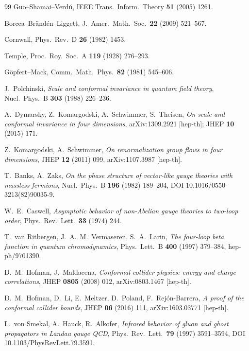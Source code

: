 {\begin{thebibliography}{99}
 Guo--Shamai--Verd\'u, IEEE Trans.\ Inform.\ Theory \textbf{51} (2005) 1261.

 Borcea--Br\"and\'en--Liggett, J.\ Amer.\ Math.\ Soc.\ \textbf{22} (2009)
  521--567.

 Cornwall, Phys.\ Rev.\ D \textbf{26} (1982) 1453.

 Temple, Proc.\ Roy.\ Soc.\ A \textbf{119} (1928) 276--293.

 G\"opfert--Mack, Comm.\ Math.\ Phys.\ \textbf{82} (1981) 545--606.

 J.~Polchinski, \emph{Scale and conformal invariance in quantum field
  theory}, Nucl.\ Phys.\ B \textbf{303} (1988) 226--236.

 A.~Dymarsky, Z.~Komargodski, A.~Schwimmer, S.~Theisen, \emph{On scale and
  conformal invariance in four dimensions}, arXiv:1309.2921 [hep-th]; JHEP \textbf{10} (2015)
  171.

 Z.~Komargodski, A.~Schwimmer, \emph{On renormalization group
  flows in four dimensions}, JHEP \textbf{12} (2011) 099, arXiv:1107.3987 [hep-th].

 T.~Banks, A.~Zaks, \emph{On the phase structure of vector-like gauge
  theories with massless fermions}, Nucl.\ Phys.\ B \textbf{196} (1982) 189--204,
  DOI 10.1016/0550-3213(82)90035-9.

 W.~E.~Caswell, \emph{Asymptotic behavior of non-Abelian gauge theories to
  two-loop order}, Phys.\ Rev.\ Lett.\ \textbf{33} (1974) 244.

 T.~van Ritbergen, J.~A.~M.~Vermaseren, S.~A.~Larin, \emph{The four-loop beta
  function in quantum chromodynamics}, Phys.\ Lett.\ B \textbf{400} (1997) 379--384,
  hep-ph/9701390.

 D.~M.~Hofman, J.~Maldacena, \emph{Conformal collider physics:
  energy and charge correlations}, JHEP \textbf{0805} (2008) 012, arXiv:0803.1467 [hep-th].

 D.~M.~Hofman, D.~Li, E.~Meltzer, D.~Poland, F.~Rej\'on-Barrera, \emph{A
  proof of the conformal collider bounds}, JHEP \textbf{06} (2016) 111, arXiv:1603.03771
  [hep-th].

 L.~von Smekal, A.~Hauck, R.~Alkofer, \emph{Infrared behavior of gluon and
  ghost propagators in Landau gauge QCD}, Phys.\ Rev.\ Lett.\ \textbf{79} (1997) 3591--3594,
  DOI 10.1103/PhysRevLett.79.3591.


\end{thebibliography}}
